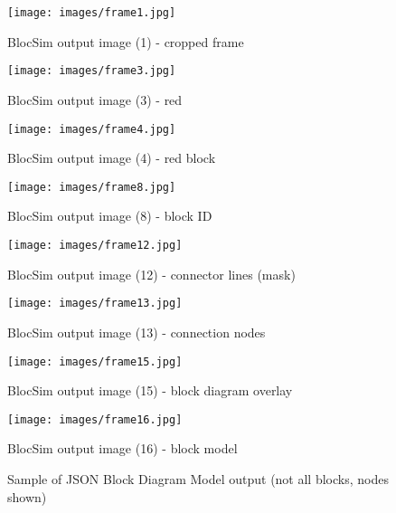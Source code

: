 \clearpage



\begin{figure}[ht!]
\centering
\texttt{[image: images/frame1.jpg]}
\caption{BlocSim output image (1) - cropped frame \cite{blocsim}}
\label{im:frame1}
\end{figure}

\begin{figure}[ht!]
\centering
\texttt{[image: images/frame3.jpg]}
\caption{BlocSim output image (3) - red \cite{blocsim}}
\label{im:frame3}
\end{figure}

\begin{figure}[ht!]
\centering
\texttt{[image: images/frame4.jpg]}
\caption{BlocSim output image (4) - red block \cite{blocsim}}
\label{im:frame4}
\end{figure}

\begin{figure}[ht!]
\centering
\texttt{[image: images/frame8.jpg]}
\caption{BlocSim output image (8) - block ID \cite{blocsim}}
\label{im:frame8}
\end{figure}

\begin{figure}[ht!]
\centering
\texttt{[image: images/frame12.jpg]}
\caption{BlocSim output image (12) - connector lines (mask) \cite{blocsim}}
\label{im:frame12}
\end{figure}

\begin{figure}[ht!]
\centering
\texttt{[image: images/frame13.jpg]}
\caption{BlocSim output image (13) - connection nodes \cite{blocsim}}
\label{im:frame13}
\end{figure}

\begin{figure}[ht!]
\centering
\texttt{[image: images/frame15.jpg]}
\caption{BlocSim output image (15) - block diagram overlay \cite{blocsim}}
\label{im:frame15}
\end{figure}

\begin{figure}[ht!]
\centering
\texttt{[image: images/frame16.jpg]}
\caption{BlocSim output image (16) - block model \cite{blocsim}}
\label{im:frame16}
\end{figure}

\clearpage



\newpage
\begin{figure}[ht!]
	\fontsize{8pt}{8pt}
	\singlespacing
	\begin{mdframed}
	\end{mdframed}
	\caption{Sample of JSON Block Diagram Model output (not all blocks, nodes shown)}
	\label{tab:json}
\end{figure}

